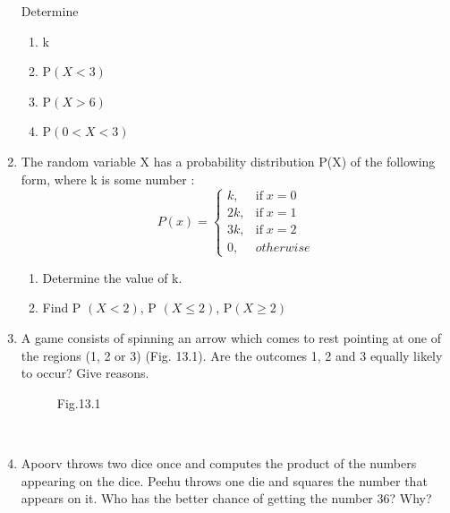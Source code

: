 \begin{enumerate}[label=\thesection.\arabic*,ref=\thesection.\theenumi]
Determine

\begin{enumerate}
\begin{table}[ht!]\centering

\end{table}
\item k
\item P$(X < 3)$
\item P$(X > 6)$
\item P$(0 < X < 3)$

\end{enumerate}

\item The random variable X has a probability distribution P(X) of the following form,
where k is some number :
\[P(x)=\begin{cases}
k, & \mbox{if}\; x= 0\\
2k, & \mbox{if}\; x= 1\\
3k, & \mbox{if}\; x= 2\\
0, & otherwise
\end{cases}\]
\begin{enumerate}
\item Determine the value of k.
\item Find P $(X < 2)$, P $(X \leq 2)$, P$(X \geq 2)$
\end{enumerate}
\item
A game consists of spinning an arrow which comes to rest pointing at one of the regions (1, 2 or 3) (Fig. 13.1). Are the outcomes 1, 2 and 3 equally likely to occur? Give reasons.\\
\begin{figure}[!ht]
	\begin{center}
		
		\resizebox{\columnwidth}{!}{}
	\end{center}
	\caption{Fig.13.1}
	\label{fig:circle.tex}	
\end{figure}\\
\solution

\item Apoorv throws two dice once and computes the product of the numbers appearing on the dice. Peehu throws one die and squares the number that appears on it. Who has the better chance of getting the number 36? Why?\\
\solution

\end{enumerate}
